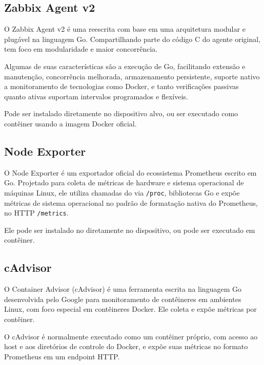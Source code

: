 \subsection{Zabbix Agent v2}
\label{subsection:ZabbixAgentV2}

O Zabbix Agent v2 \citep{zabbix2025} é uma reescrita com base em uma arquitetura modular e plugável na linguagem Go. Compartilhando parte do código C do agente original, tem foco em modularidade e maior concorrência.

Algumas de suas características são a execução de  Go, facilitando extensão e manutenção, concorrência melhorada, armazenamento persistente, suporte nativo a monitoramento de tecnologias como Docker, e tanto verificações passivas quanto ativas suportam intervalos programados e flexíveis.

Pode ser instalado diretamente no dispositivo alvo, ou ser executado como contêiner usando a imagem Docker oficial.

\subsection{Node Exporter}
\label{subsection:NodeExporter}

O Node Exporter \citep{nodeexporter2025} é um exportador oficial do ecossistema Prometheus escrito em Go. Projetado para coleta de métricas de hardware e sistema operacional de máquinas Linux, ele utiliza chamadas do  via \verb|/proc|, bibliotecas Go e expõe métricas de sistema operacional no padrão de formatação nativa do Prometheus, no  HTTP \verb|/metrics|.

Ele pode ser instalado no diretamente no dispositivo, ou pode ser executado em contêiner. 

\subsection{cAdvisor}
\label{subsection:cAdvisor}

O Container Advisor (cAdvisor) \citep{cadvisor2025} é uma ferramenta escrita na linguagem Go desenvolvida pelo Google para monitoramento de contêineres em ambientes Linux, com foco especial em contêineres Docker. Ele coleta e expõe métricas por contêiner.

O cAdvisor é normalmente executado como um contêiner próprio, com acesso ao host e aos diretórios de controle do Docker, e expõe suas métricas no formato Prometheus em um endpoint HTTP.

